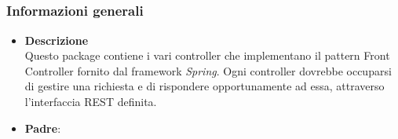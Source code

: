 \subsection{}
\label{\nogloxy{swedesigner::server::controller}}
\subsubsection{Informazioni generali}
\begin{itemize}
\item \textbf{Descrizione}\\
Questo package contiene i vari controller che implementano il pattern Front Controller fornito dal framework \emph{Spring}. Ogni controller dovrebbe occuparsi di gestire una richiesta e di rispondere opportunamente ad essa, attraverso l'interfaccia REST definita.
\item \textbf{Padre}: \hyperref[\nogloxy{swedesigner::server}]{}
\end{itemize}
